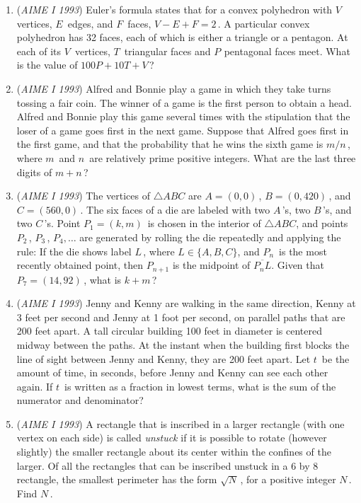 \begin{enumerate}
	\item (\textit{AIME I 1993}) Euler's formula states that for a convex polyhedron with $V\,$ vertices, $E\,$ edges, and $F\,$ faces, $V-E+F=2\,$. A particular convex polyhedron has 32 faces, each of which is either a triangle or a pentagon. At each of its $V\,$ vertices, $T\,$ triangular faces and $P^{}_{}$ pentagonal faces meet. What is the value of $100P+10T+V\,$? 


 

	\item (\textit{AIME I 1993}) Alfred and Bonnie play a game in which they take turns tossing a fair coin. The winner of a game is the first person to obtain a head. Alfred and Bonnie play this game several times with the stipulation that the loser of a game goes first in the next game. Suppose that Alfred goes first in the first game, and that the probability that he wins the sixth game is $m/n\,$, where $m\,$ and $n\,$ are relatively prime positive integers. What are the last three digits of $m+n\,$? 


 

	\item (\textit{AIME I 1993}) The vertices of $\triangle ABC$ are $A = (0,0)\,$, $B = (0,420)\,$, and $C = (560,0)\,$.  The six faces of a die are labeled with two $A\,$'s, two $B\,$'s, and two $C\,$'s.  Point $P_1 = (k,m)\,$ is chosen in the interior of $\triangle ABC$, and points $P_2\,$, $P_3\,$, $P_4, \dots$ are generated by rolling the die repeatedly and applying the rule: If the die shows label $L\,$, where $L \in \{A, B, C\}$, and $P_n\,$ is the most recently obtained point, then $P_{n + 1}^{}$ is the midpoint of $\overline{P_n L}$.  Given that $P_7 = (14,92)\,$, what is $k + m\,$?


 

	\item (\textit{AIME I 1993}) Jenny and Kenny are walking in the same direction, Kenny at 3 feet per second and Jenny at 1 foot per second, on parallel paths that are 200 feet apart. A tall circular building 100 feet in diameter is centered midway between the paths. At the instant when the building first blocks the line of sight between Jenny and Kenny, they are 200 feet apart. Let $t\,$ be the amount of time, in seconds, before Jenny and Kenny can see each other again. If $t\,$ is written as a fraction in lowest terms, what is the sum of the numerator and denominator?


 

	\item (\textit{AIME I 1993}) A rectangle that is inscribed in a larger rectangle (with one vertex on each side) is called \textit{unstuck} if it is possible to rotate (however slightly) the smaller rectangle about its center within the confines of the larger. Of all the rectangles that can be inscribed unstuck in a 6 by 8 rectangle, the smallest perimeter has the form $\sqrt{N}\,$, for a positive integer $N\,$. Find $N\,$.



\end{enumerate}
